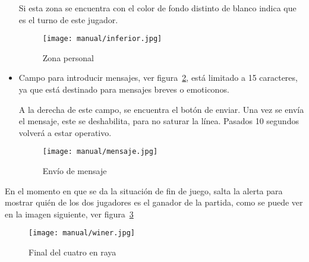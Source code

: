 \begin{itemize}
	Si esta zona se encuentra con el color de fondo distinto de blanco indica que es el turno de este jugador.
	
	\begin{figure}%
		\centering
		\texttt{[image: manual/inferior.jpg]}
		\caption{Zona personal}\label{fig:inferior}
	\end{figure}

	\item Campo para introducir mensajes, ver figura~\ref{fig:mensaje}, está limitado a 15 caracteres, ya que está destinado para mensajes breves o emoticonos.
	
	A la derecha de este campo, se encuentra el botón de enviar. Una vez se envía el mensaje, este se deshabilita, para no saturar la línea. Pasados 10 segundos volverá a estar operativo.
	
	\begin{figure}%
		\centering
		\texttt{[image: manual/mensaje.jpg]}
		\caption{Envío de mensaje}\label{fig:mensaje}
	\end{figure}
\end{itemize}

En el momento en que se da la situación de fin de juego, salta la alerta para mostrar quién de los dos jugadores es el ganador de la partida, como se puede ver en la imagen siguiente, ver figura~\ref{fig:finalcuatro}

\begin{figure}%
	\centering
	\texttt{[image: manual/winer.jpg]}
	\caption{Final del cuatro en raya}\label{fig:finalcuatro}
\end{figure} 